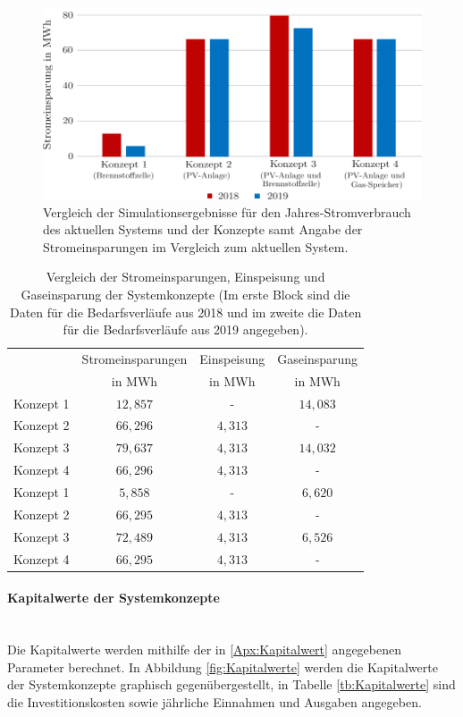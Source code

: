 \begin{figure}[h]
	\centering
		\includegraphics[scale=1]{Figures/Stromverbrauch_Sim_2}
		\caption{Vergleich der Simulationsergebnisse für den Jahres-Stromverbrauch des aktuellen Systems und der Konzepte samt Angabe der Stromeinsparungen im Vergleich zum aktuellen System.}
\label{fig:Strom}	
\end{figure}

\begin{table}[htb]
		\centering
		\caption{Vergleich der Stromeinsparungen, Einspeisung und Gaseinsparung der Systemkonzepte (Im erste Block sind die Daten für die Bedarfsverläufe aus 2018 und im zweite die Daten für die Bedarfsverläufe aus 2019 angegeben).}
		\begin{tabular}{l c c c}
		\toprule 
		& Stromeinsparungen & Einspeisung & Gaseinsparung
		\\
	    & in MWh & in MWh & in MWh\\
		\midrule
		Konzept 1 & $12,857$ &    -    & $14,083$\\
		Konzept 2 & $66,296$ & $4,313$ &    -    \\
		Konzept 3 & $79,637$ & $4,313$ & $14,032$\\
		Konzept 4 & $66,296$ & $4,313$ &    -    \\
		\midrule
		Konzept 1 & $5,858$  &    -    & $6,620$\\
		Konzept 2 & $66,295$ & $4,313$ &    -   \\
		Konzept 3 & $72,489$ & $4,313$ & $6,526$\\
		Konzept 4 & $66,295$ & $4,313$ &    -   \\
		\bottomrule
		\end{tabular}
		\label{tb:ErgebnisseSim}
\end{table}	
\FloatBarrier

\paragraph{Kapitalwerte der Systemkonzepte}\ \\
Die Kapitalwerte werden mithilfe der in \ref{Apx:Kapitalwert} angegebenen Parameter berechnet. In Abbildung \ref{fig:Kapitalwerte} werden die Kapitalwerte der Systemkonzepte graphisch gegenübergestellt, in Tabelle \ref{tb:Kapitalwerte} sind die Investitionskosten sowie jährliche Einnahmen und Ausgaben angegeben.\\

